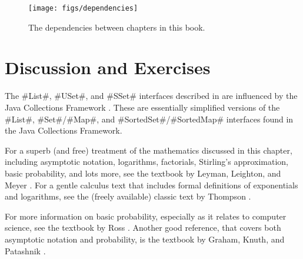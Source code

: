 \begin{figure}
  \begin{center}
    \texttt{[image: figs/dependencies]}
  \end{center}
  \caption{The dependencies between chapters in this book.}
\end{figure}

\section{Discussion and Exercises}

The #List#, #USet#, and #SSet# interfaces described in
 are influenced by the Java Collections Framework
\cite{oracle_collections}.  These are essentially simplified versions of
the #List#, #Set#/#Map#, and #SortedSet#/#SortedMap# interfaces found in
the Java Collections Framework.  

For a superb (and free) treatment of the mathematics discussed in this
chapter, including asymptotic notation, logarithms, factorials, Stirling's
approximation, basic probability, and lots more, see the textbook by
Leyman, Leighton, and Meyer \cite{llm11}.  For a gentle calculus text
that includes formal definitions of exponentials and logarithms, see the
(freely available) classic text by Thompson \cite{t14}.

For more information on basic probability, especially as it relates to
computer science, see the textbook by Ross \cite{r01}.  Another good
reference, that covers both asymptotic notation and probability, is the
textbook by Graham, Knuth, and Patashnik \cite{gkp94}.


